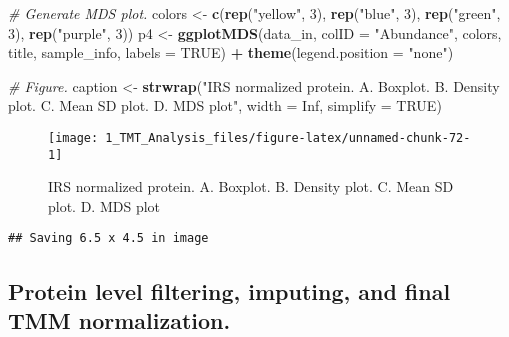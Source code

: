 \documentclass[]{article}
\newenvironment{Shaded}{\begin{snugshade}}{\end{snugshade}}
\newcommand{\KeywordTok}[1]{\textcolor[rgb]{0.13,0.29,0.53}{\textbf{#1}}}
\newcommand{\DataTypeTok}[1]{\textcolor[rgb]{0.13,0.29,0.53}{#1}}
\newcommand{\DecValTok}[1]{\textcolor[rgb]{0.00,0.00,0.81}{#1}}
\newcommand{\StringTok}[1]{\textcolor[rgb]{0.31,0.60,0.02}{#1}}
\newcommand{\CommentTok}[1]{\textcolor[rgb]{0.56,0.35,0.01}{\textit{#1}}}
\newcommand{\OtherTok}[1]{\textcolor[rgb]{0.56,0.35,0.01}{#1}}
\newcommand{\OperatorTok}[1]{\textcolor[rgb]{0.81,0.36,0.00}{\textbf{#1}}}
\newcommand{\NormalTok}[1]{#1}
\begin{document}
\begin{Shaded}
\begin{Highlighting}[]
\CommentTok{# Generate MDS plot.}
\NormalTok{colors <-}\StringTok{ }\KeywordTok{c}\NormalTok{(}\KeywordTok{rep}\NormalTok{(}\StringTok{"yellow"}\NormalTok{, }\DecValTok{3}\NormalTok{), }\KeywordTok{rep}\NormalTok{(}\StringTok{"blue"}\NormalTok{, }\DecValTok{3}\NormalTok{), }\KeywordTok{rep}\NormalTok{(}\StringTok{"green"}\NormalTok{, }\DecValTok{3}\NormalTok{), }\KeywordTok{rep}\NormalTok{(}\StringTok{"purple"}\NormalTok{, }\DecValTok{3}\NormalTok{))}
\NormalTok{p4 <-}\StringTok{ }\KeywordTok{ggplotMDS}\NormalTok{(data_in, }\DataTypeTok{colID =} \StringTok{"Abundance"}\NormalTok{, colors, title, sample_info, }\DataTypeTok{labels =} \OtherTok{TRUE}\NormalTok{) }\OperatorTok{+}
\StringTok{  }\KeywordTok{theme}\NormalTok{(}\DataTypeTok{legend.position =} \StringTok{"none"}\NormalTok{)}

\CommentTok{# Figure.}
\NormalTok{caption <-}\StringTok{ }\KeywordTok{strwrap}\NormalTok{(}\StringTok{"IRS normalized protein. A. Boxplot. B. Density plot.}
\StringTok{                   C. Mean SD plot. D. MDS plot"}\NormalTok{, }\DataTypeTok{width =} \OtherTok{Inf}\NormalTok{, }\DataTypeTok{simplify =} \OtherTok{TRUE}\NormalTok{)}
\end{Highlighting}
\end{Shaded}

\begin{figure}

{\centering \texttt{[image: 1\_TMT\_Analysis\_files/figure-latex/unnamed-chunk-72-1]} 

}

\caption{IRS normalized protein. A. Boxplot. B. Density plot.  C. Mean SD plot. D. MDS plot}\label{fig:unnamed-chunk-72}
\end{figure}

\begin{verbatim}
## Saving 6.5 x 4.5 in image
\end{verbatim}

\subsection{Protein level filtering, imputing, and final TMM
normalization.}\label{protein-level-filtering-imputing-and-final-tmm-normalization.}

\begin{Shaded}
\end{Shaded}
\end{document}
